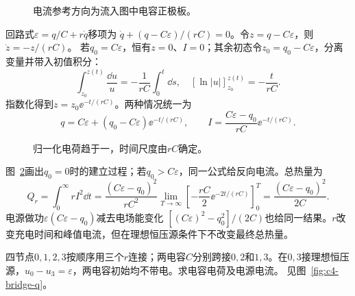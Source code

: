 \begin{figure}[H]\centering
{}
\caption{电流参考方向为流入图中电容正极板。}\label{fig:c4-rc-q}
\end{figure}
\begin{solution}
回路式$\varepsilon=q/C+r\dot q$移项为
$\dot q+(q-C\varepsilon)/(rC)=0$。令$z=q-C\varepsilon$，则$\dot z=-z/(rC)$。
若$q_0=C\varepsilon$，恒有$z=0$、$I=0$；其余初态令$z_0=q_0-C\varepsilon$，分离变量并带入初值积分：
\[
 \int_{z_0}^{z(t)}\frac{\dd u}{u}=-\frac1{rC}\int_0^t\dd s,
 \quad [\ln|u|]_{z_0}^{z(t)}=-\frac t{rC}.
\]
指数化得到$z=z_0\ee^{-t/(rC)}$。两种情况统一为
\[
 \boxed{q=C\varepsilon+(q_0-C\varepsilon)\ee^{-t/(rC)}},
 \qquad I=\frac{C\varepsilon-q_0}{rC}\ee^{-t/(rC)}.
\]

\begin{figure}[H]\centering
{}
\caption{归一化电荷趋于一，时间尺度由$rC$确定。}\label{fig:c4-rc-s}
\end{figure}

图~\ref{fig:c4-rc-s}画出$q_0=0$时的建立过程；若$q_0>C\varepsilon$，同一公式给反向电流。总热量为
\[
 Q_r=\int_0^\infty rI^2\dd t
 =\frac{(C\varepsilon-q_0)^2}{rC^2}
 \lim_{T\to\infty}\left[-\frac{rC}2\ee^{-2t/(rC)}\right]_0^T
 =\boxed{\frac{(C\varepsilon-q_0)^2}{2C}}.
\]
电源做功$\varepsilon(C\varepsilon-q_0)$减去电场能变化
$[(C\varepsilon)^2-q_0^2]/(2C)$也给同一结果。$r$改变充电时间和峰值电流，但在理想恒压源条件下不改变最终总热量。
\end{solution}

\begin{example}[三电阻与两交叉电容]\label{ex:c4-bridge}
四节点$0,1,2,3$按顺序用三个$r$连接；两电容$C$分别跨接$0,2$和$1,3$。在$0,3$接理想恒压源，$u_0-u_3=\varepsilon$，两电容初始均不带电。求电容电荷及电源电流。 见图~\ref{fig:c4-bridge-q}。
\end{example}

